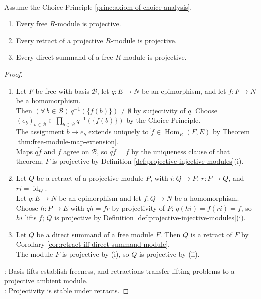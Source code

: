 \begin{theorem} \label{thm:basic-projective-constructions} \\
Assume the Choice Principle \ref{princ:axiom-of-choice-analysis}.
\begin{enumerate}[label=(\roman*)]
\setlength{\itemsep}{0pt}
\item Every free $R$-module is projective.
\item Every retract of a projective $R$-module is projective.
\item Every direct summand of a free $R$-module is projective.
\end{enumerate}
\begin{proof}
\begin{enumerate}[label=(\roman*)]
\setlength{\itemsep}{0pt}
\item Let $F$ be free with basis $\mathcal B$, let $q:E\to N$ be an epimorphism, and let $f:F\to N$ be a homomorphism.\\
Then $(\forall\,b\in\mathcal B)\,q^{-1}(\{f(b)\})\neq\emptyset$ by surjectivity of $q$. Choose $(e_b)_{b\in\mathcal B}\in\prod\limits_{b\in\mathcal B}q^{-1}(\{f(b)\})$ by the Choice Principle.\\
The assignment $b\mapsto e_b$ extends uniquely to $\widetilde f\in\operatorname{Hom}_R(F,E)$ by Theorem \ref{thm:free-module-map-extension}.\\
Maps $q\widetilde f$ and $f$ agree on $\mathcal B$, so $q\widetilde f=f$ by the uniqueness clause of that theorem; $F$ is projective by Definition \ref{def:projective-injective-modules}(i).
\item Let $Q$ be a retract of a projective module $P$, with $i:Q\to P$, $r:P\to Q$, and $ri=\operatorname{id}_Q$.\\
Let $q:E\to N$ be an epimorphism and let $f:Q\to N$ be a homomorphism.\\
Choose $h:P\to E$ with $qh=fr$ by projectivity of $P$; $q(hi)=f(ri)=f$, so $hi$ lifts $f$; $Q$ is projective by Definition \ref{def:projective-injective-modules}(i).
\item Let $Q$ be a direct summand of a free module $F$. Then $Q$ is a retract of $F$ by Corollary \ref{cor:retract-iff-direct-summand-module}.\\
The module $F$ is projective by (i), so $Q$ is projective by (ii).
\end{enumerate}
: Basis lifts establish freeness, and retractions transfer lifting problems to a projective ambient module.\\
: Projectivity is stable under retracts.
\end{proof}
\end{theorem}

